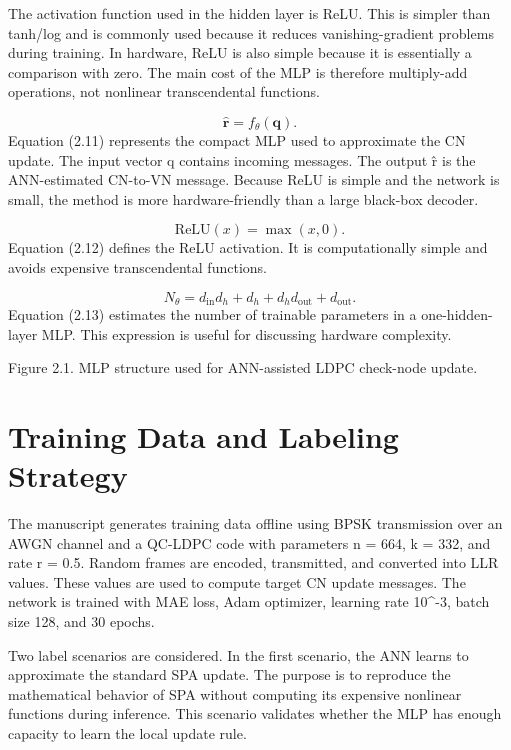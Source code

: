 The activation function used in the hidden layer is ReLU. This is simpler than tanh/log and is commonly used because it reduces vanishing-gradient problems during training. In hardware, ReLU is also simple because it is essentially a comparison with zero. The main cost of the MLP is therefore multiply-add operations, not nonlinear transcendental functions.

\begin{equation}
\hat{\mathbf{r}}=f_{\theta}(\mathbf{q}).
\end{equation}
Equation (2.11) represents the compact MLP used to approximate the CN update. The input vector q contains incoming messages. The output r̂ is the ANN-estimated CN-to-VN message. Because ReLU is simple and the network is small, the method is more hardware-friendly than a large black-box decoder.

\begin{equation}
\mathrm{ReLU}(x)=\max(x,0).
\end{equation}
Equation (2.12) defines the ReLU activation. It is computationally simple and avoids expensive transcendental functions.

\begin{equation}
N_{\theta}=d_{\mathrm{in}}d_h+d_h+d_hd_{\mathrm{out}}+d_{\mathrm{out}}.
\end{equation}
Equation (2.13) estimates the number of trainable parameters in a one-hidden-layer MLP. This expression is useful for discussing hardware complexity.

Figure 2.1. MLP structure used for ANN-assisted LDPC check-node update.

\section{Training Data and Labeling Strategy}
The manuscript generates training data offline using BPSK transmission over an AWGN channel and a QC-LDPC code with parameters n = 664, k = 332, and rate r = 0.5. Random frames are encoded, transmitted, and converted into LLR values. These values are used to compute target CN update messages. The network is trained with MAE loss, Adam optimizer, learning rate 10\textasciicircum{}-3, batch size 128, and 30 epochs.

Two label scenarios are considered. In the first scenario, the ANN learns to approximate the standard SPA update. The purpose is to reproduce the mathematical behavior of SPA without computing its expensive nonlinear functions during inference. This scenario validates whether the MLP has enough capacity to learn the local update rule.


